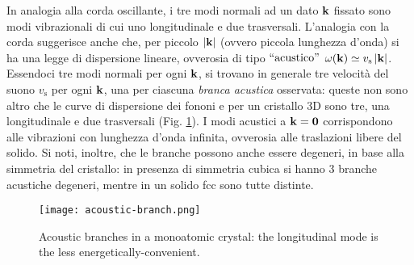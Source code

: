 In analogia alla corda oscillante, i tre modi normali ad un dato $ \mathbf{k} $ fissato sono modi vibrazionali di cui uno longitudinale e due trasversali. L'analogia con la corda suggerisce anche che, per piccolo $ \left\lvert\mathbf{k}\right\rvert $ (ovvero piccola lunghezza d'onda) si ha una legge di dispersione lineare, ovverosia di tipo $ ``\text{acustico}" $ $ \omega(\mathbf{k}) \simeq v_\text{s} \left\lvert\mathbf{k}\right\rvert $. Essendoci tre modi normali per ogni $ \mathbf{k} $, si trovano in generale tre velocità del suono $ v_\text{s} $ per ogni $ \mathbf{k} $, una per ciascuna \textit{branca acustica} osservata: queste non sono altro che le curve di dispersione dei fononi e per un cristallo 3D sono tre, una longitudinale e due trasversali (Fig. \ref{ac-br}). I modi acustici a $ \mathbf{k} = \mathbf{0} $ corrispondono alle vibrazioni con lunghezza d'onda infinita, ovverosia alle traslazioni libere del solido. Si noti, inoltre, che le branche possono anche essere degeneri, in base alla simmetria del cristallo: in presenza di simmetria cubica si hanno 3 branche acustiche degeneri, mentre in un solido fcc sono tutte distinte.

\begin{figure}
	\centering
	\texttt{[image: acoustic-branch.png]}
	\caption{Acoustic branches in a monoatomic crystal: the longitudinal mode is the less energetically-convenient.}
	\label{ac-br}
\end{figure}

